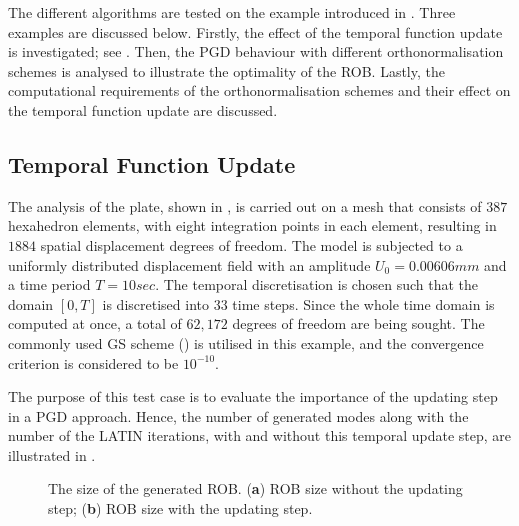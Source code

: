 The different algorithms are tested on the example introduced in . Three examples are discussed below. Firstly, the effect of the temporal function update is investigated; see . Then, the PGD behaviour with different orthonormalisation schemes is analysed to illustrate the optimality of the ROB. Lastly, the computational requirements of the orthonormalisation schemes and their effect on the temporal function update are discussed.

\subsection{Temporal Function Update}
The analysis of the plate, shown in , is carried out on a mesh that consists of $387$ hexahedron elements, with eight integration points in each element, resulting in $1884$ spatial displacement degrees of freedom. The model is subjected to a uniformly distributed displacement field with an amplitude $U_0= 0.00606 \unit{mm}$ and a time period $T = 10 \unit{sec}$. The temporal discretisation is chosen such that the domain $[0,T]$ is discretised into $33$ time steps. Since the whole time domain is computed at once, a total of $62,172$ degrees of freedom are being sought. The commonly used GS scheme () is utilised in this example, and the convergence criterion is considered to be $10^{-10}$.

The purpose of this test case is to evaluate the importance of the updating step in a PGD approach. Hence, the number of generated modes along with the number of the LATIN iterations, with and without this temporal update step, are illustrated in .

\begin{figure}[hbt!]
	\centering
	\begin{subfigure}[]{0.49\linewidth}
		
		\caption{}
	\end{subfigure}
	\hfil
	\begin{subfigure}[]{0.49\linewidth}
		
		\caption{}
	\end{subfigure}
	\caption{The size of the generated ROB. (\textbf{a}) {ROB}
		size without the updating step; (\textbf{b}) ROB size with the updating step.}
	\label{fig_time_update}
\end{figure}

